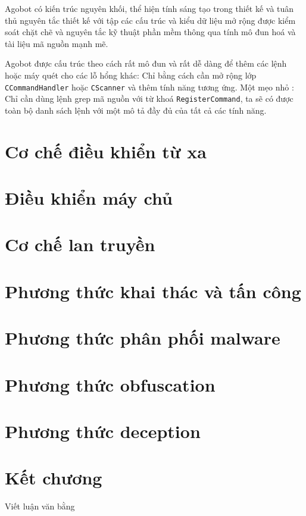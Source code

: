 Agobot có kiến trúc nguyên khối, thể hiện tính sáng tạo trong thiết kế và
tuân thủ nguyên tắc thiết kế với tập các cấu trúc và kiểu dữ liệu mở rộng
được kiểm soát chặt chẽ và nguyên tắc kỹ thuật phần mềm thông qua tính
mô đun hoá và tài liệu mã nguồn mạnh mẽ.

Agobot được cấu trúc theo cách rất mô đun và rất dễ dàng để thêm các lệnh
hoặc máy quét cho các lỗ hổng khác: Chỉ bằng cách cần mở rộng lớp
\texttt{CCommandHandler} hoặc \texttt{CScanner} và thêm tính năng tương ứng.
Một mẹo nhỏ \cite{honeynetgrep}: Chỉ cần dùng lệnh grep mã nguồn với từ khoá \texttt{RegisterCommand},
ta sẽ có được toàn bộ danh sách lệnh với một mô tả đầy đủ của tất cả các tính năng.

\section{Cơ chế điều khiển từ xa}
\section{Điều khiển máy chủ}
\section{Cơ chế lan truyền}
\section{Phương thức khai thác và tấn công}
\section{Phương thức phân phối malware}
\section{Phương thức obfuscation}
\section{Phương thức deception}

\section{Kết chương}
Viết luận văn bằng